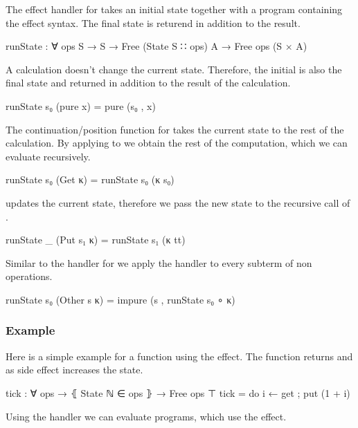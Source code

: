 \begin{AgdaAlign}
The effect handler for  takes an initial state together
with a program containing the effect syntax.
The final state is returend in addition to the result.

\begin{code}
runState : ∀ {ops S} → S → Free (State S ∷ ops) A → Free ops (S × A)
\end{code}
A  calculation doesn't change the current state.
Therefore, the initial is also the final state and returned in addition to the
result of the calculation.
\begin{code}
runState s₀ (pure x)     = pure (s₀ , x)
\end{code}
The continuation/position function for  takes the current
state to the rest of the calculation.
By applying  to  we obtain the rest of the
computation, which we can evaluate recursively.
\begin{code}
runState s₀ (Get κ)      = runState s₀ (κ s₀)
\end{code}
 updates the current state, therefore we pass the new state
 to the recursive call of .
\begin{code}
runState _  (Put s₁ κ)   = runState s₁ (κ tt)
\end{code}
Similar to the handler for  we apply the handler to every
subterm of non  operations.
\begin{code}
runState s₀ (Other s κ)  = impure (s , runState s₀ ∘ κ)
\end{code}
\end{AgdaAlign}



\subsubsection{Example}

Here is a simple example for a function using the 
effect.
The function  returns  and
as side effect increases the state.

\begin{code}
tick : ∀ {ops} → ⦃ State ℕ ∈ ops ⦄ → Free ops ⊤
tick = do i ← get ; put (1 + i)
\end{code}
Using the  handler we can evaluate programs, which use
the  effect.

